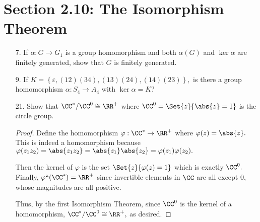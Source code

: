 \documentclass{article}
\begin{document}
\section*{Section 2.10: The Isomorphism Theorem}

\begin{itemize}
	\item[7.] If $\alpha:G\to G_1$ is a group homomorphism and both $\alpha(G)$ and $\ker \alpha$ are finitely generated, show that $G$ is finitely generated.

	\item[9.] If $K=\left\{ \varepsilon, (12)(34), (13)(24), (14)(23) \right\},$ is there a group homomorphism $\alpha:S_4\to A_4$ with $\ker \alpha=K?$

	\item[21.] Show that $\CC^*/\CC^0\cong \RR^+$ where $\CC^0=\Set{z}{\abs{z}=1}$ is the circle group.
		\begin{proof}
			Define the homomorphism $\varphi:\CC^*\to\RR^+$ where $\varphi(z)=\abs{z}.$ This is indeed a homomorphism because $\varphi(z_1z_2)=\abs{z_1z_2}=\abs{z_1}\abs{z_2}=\varphi(z_1)\varphi(z_2).$ 
			
			Then the kernel of $\varphi$ is the set $\Set{z}{\varphi(z)=1}$ which is exactly $\CC^0.$ Finally, $\varphi``(\CC^*)=\RR^+$ since invertible elements in $\CC$ are all except 0, whose magnitudes are all positive. 

			Thus, by the first Isomorphism Theorem, since $\CC^0$ is the kernel of a homomorphism, $\CC^*/\CC^0\cong \RR^+,$ as desired.
			
		\end{proof}
		
\end{itemize}
\end{document}
